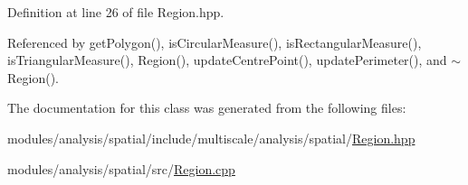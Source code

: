 Definition at line 26 of file Region.\-hpp.



Referenced by get\-Polygon(), is\-Circular\-Measure(), is\-Rectangular\-Measure(), is\-Triangular\-Measure(), Region(), update\-Centre\-Point(), update\-Perimeter(), and $\sim$\-Region().



The documentation for this class was generated from the following files\-:\begin{DoxyCompactItemize}
\item 
modules/analysis/spatial/include/multiscale/analysis/spatial/\hyperlink{Region_8hpp}{Region.\-hpp}\item 
modules/analysis/spatial/src/\hyperlink{Region_8cpp}{Region.\-cpp}\end{DoxyCompactItemize}
